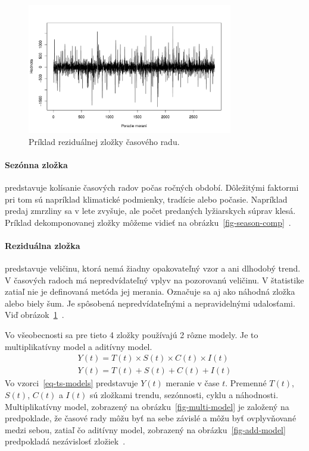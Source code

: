 \documentclass[a4paper,slovak,12pt,appendix]{article}
\begin{document}
\begin{figure}[H]
  \centering
  \includegraphics[width=0.8\textwidth]{random_component.pdf}
  \caption{Príklad reziduálnej zložky časového radu.}
  \label{fig-random-comp}
\end{figure}

\paragraph{Sezónna zložka} predstavuje kolísanie časových radov počas ročných
období. Dôležitými faktormi pri tom sú napríklad klimatické podmienky, tradície
alebo počasie. Napríklad predaj zmrzliny sa v lete zvyšuje, ale počet
predaných lyžiarskych súprav klesá. Príklad dekomponovanej zložky môžeme vidieť
na obrázku~\ref{fig-season-comp}~\cite{Agrawal2013}.

\paragraph{Reziduálna zložka} predstavuje veličinu, ktorá nemá žiadny
opakovateľný vzor a ani dlhodobý trend. V časových radoch má nepredvídateľný
vplyv na pozorovanú veličinu. V štatistike zatiaľ nie je definovaná metóda jej
merania. Označuje sa aj ako náhodná zložka alebo biely šum. Je spôsobená
nepredvídateľnými a nepravidelnými udalosťami.
Viď obrázok~\ref{fig-random-comp}~\cite{Agrawal2013}.

Vo všeobecnosti sa pre tieto 4 zložky používajú 2 rôzne modely. Je to
multiplikatívny model a aditívny model.
\begin{equation}
  \begin{split}
    Y(t) = T(t) \times S(t) \times C(t) \times I(t)
    \\
    Y(t) = T(t) + S(t) + C(t) + I(t)
  \end{split}
  \label{eq-ts-models}
\end{equation}
Vo vzorci~\ref{eq-ts-models} predstavuje $Y(t)$ meranie v čase $t$. Premenné
$T(t)$, $S(t)$, $C(t)$ a $I(t)$ sú zložkami trendu, sezónnosti,
cyklu a náhodnosti. Multiplikatívny model, zobrazený na
obrázku~\ref{fig-multi-model} je založený na predpoklade, že časové rady môžu
byť na sebe závislé a môžu byť ovplyvňované medzi sebou, zatiaľ čo aditívny
model, zobrazený na obrázku~\ref{fig-add-model} predpokladá nezávislosť
zložiek~\cite{Agrawal2013}.
\end{document}
